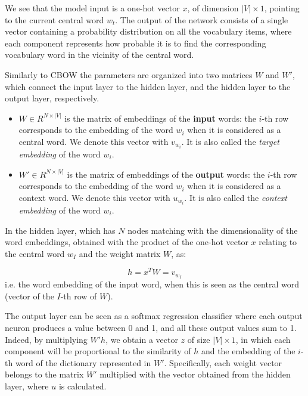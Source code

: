 We see that the model input is a one-hot vector $x$, of dimension $|V| \times 1$, pointing to the current central word $w_t$. The output of the network consists of a single vector containing a probability distribution on all the vocabulary items, where each component represents how probable it is to find the corresponding vocabulary word in the vicinity of the central word.


Similarly to \ac{CBOW} the parameters are organized into two matrices $W$ and $W'$, which connect the input layer to the hidden layer, and the hidden layer to the output layer, respectively.

\begin{itemize}
    \item $W \in R^{N \times |V|}$ is the matrix of embeddings of the \textbf{input} words: the $i$-th row corresponds to the embedding of the word $w_i$ when it is considered as a central word. We denote this vector with $v_{w_i}$. It is also called the \textit{target embedding} of the word $w_i$.
    \item $W' \in R^{N \times |V|}$ is the matrix of embeddings of the \textbf{output} words: the $i$-th row corresponds to the embedding of the word $w_i$ when it is considered as a context word. We denote this vector with $u_{w_i}$. It is also called the \textit{context embedding} of the word $w_i$.
\end{itemize}

In the hidden layer, which has $N$ nodes matching with the dimensionality of the word embeddings, obtained with the product of the one-hot vector $x$ relating to the central word $w_I$ and the weight matrix $W$, as:

\[
h = x^T W = v_{w_{I}}
\]
\noindent
i.e. the word embedding of the input word, when this is seen as the central word (vector of the $I$-th row of $W$).

The output layer can be seen as a softmax regression classifier where each output neuron produces a value between 0 and 1, and all these output values sum to 1. Indeed, by multiplying $W'h$, we obtain a vector $z$ of size $|V| \times 1$, in which each component will be proportional to the similarity of $h$ and the embedding of the $i$-th word of the dictionary represented in $W'$. Specifically, each weight vector belongs to the matrix $W'$ multiplied with the vector obtained from the hidden layer, where $u$ is calculated.

